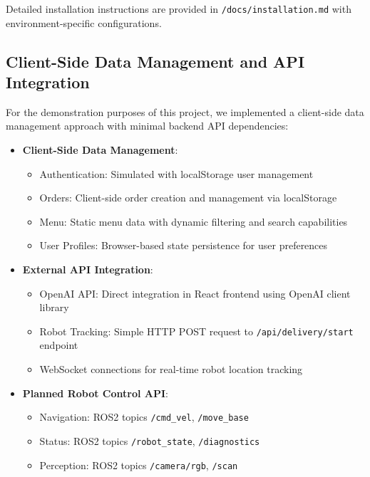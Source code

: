 \documentclass[12pt]{article}
\begin{document}
Detailed installation instructions are provided in \texttt{/docs/installation.md} with environment-specific configurations.

\subsection{Client-Side Data Management and API Integration}

For the demonstration purposes of this project, we implemented a client-side data management approach with minimal backend API dependencies:

\begin{itemize}
    \item \textbf{Client-Side Data Management}:
    \begin{itemize}
        \item Authentication: Simulated with localStorage user management
        \item Orders: Client-side order creation and management via localStorage
        \item Menu: Static menu data with dynamic filtering and search capabilities
        \item User Profiles: Browser-based state persistence for user preferences
    \end{itemize}
    
    \item \textbf{External API Integration}:
    \begin{itemize}
        \item OpenAI API: Direct integration in React frontend using OpenAI client library
        \item Robot Tracking: Simple HTTP POST request to \texttt{/api/delivery/start} endpoint
        \item WebSocket connections for real-time robot location tracking
    \end{itemize}
    
    \item \textbf{Planned Robot Control API}:
    \begin{itemize}
        \item Navigation: ROS2 topics \texttt{/cmd\_vel}, \texttt{/move\_base}
        \item Status: ROS2 topics \texttt{/robot\_state}, \texttt{/diagnostics}
        \item Perception: ROS2 topics \texttt{/camera/rgb}, \texttt{/scan}
    \end{itemize}
\end{itemize}
\end{document}
